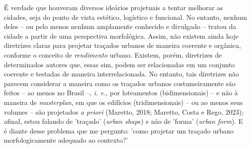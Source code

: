 \documentclass[]{report}
\begin{document}
	É verdade que houveram diversos ideários projetuais a tentar melhorar as cidades, seja do ponto de vista estético, logístico e funcional. No entanto, nenhum deles – ou pelo menos nenhum amplamente conhecido e divulgado – tratou da cidade a partir de uma perspectiva morfológica. Assim, não existem ainda hoje diretrizes claras para projetar traçados urbanos de maneira coerente e orgânica, conforme o conceito de \textit{rendimento} urbano. Existem, porém, diretrizes de determinados autores que, essas sim, podem ser relacionadas em um conjunto coerente e testadas de maneira interrelacionada. No entanto, tais diretrizes não parecem considerar a maneira como os traçados urbanos costumeiramente são feitos – ao menos no Brasil –, \textit{i. e.,} por loteamentos (bidimensionais) – e não à maneira de \textit{masterplan}, em que os edifícios (tridimensionais) – ou ao menos seus volumes – são projetados \textit{a priori} (Maretto, 2018; Maretto, Costa e Rego, 2023); afinal, estou falando de 'traçado' (\textit{urban shape}) e não de 'forma' (\textit{urban form}). E é diante desse problema que me pergunto: 'como projetar um traçado urbano morfologicamente adequado ao contexto?'
\end{document}
